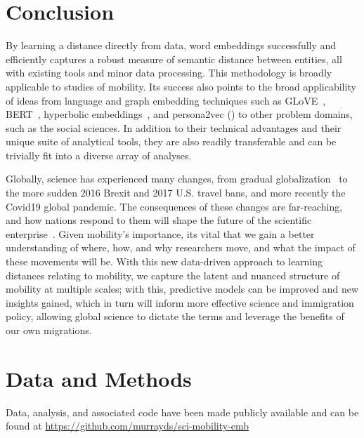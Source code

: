 \documentclass[12pt]{article} %
\begin{document}
%
%
\section*{Conclusion}

By learning a distance directly from data, word embeddings successfully  and efficiently captures a robust measure of semantic distance between entities, all with existing tools and minor data processing.
This methodology is broadly applicable to studies of mobility.
Its success also points to the broad applicability of ideas from language and graph embedding techniques such as GLoVE~\autocite{pennington2014glove}, BERT~\autocite{devlin2018bert}, hyperbolic embeddings~\autocite{nickel2017poincare, linzhuo2020hyperbolic}, and persona2vec () to other problem domains, such as the social sciences.
In addition to their technical advantages and their unique suite of analytical tools, they are also readily transferable and can be trivially fit into a diverse array of analyses.

Globally, science has experienced many changes, from gradual globalization~\autocite{czaika2018globalisation} to the more sudden 2016 Brexit and 2017 U.S. travel bans, and more recently the Covid19 global pandemic.
The consequences of these changes are far-reaching, and how nations respond to them will shape the future of the scientific enterprise~\autocite{chinchilla2018travelban, wagner2017open, sugimoto2017mostimpact, whetsell2019democracy}.
Given mobility's importance, its vital that we gain a better understanding of where, how, and why researchers move, and what the impact of these movements will be.
With this new data-driven approach to learning distances relating to mobility, we capture the latent and nuanced structure of mobility at multiple scales;
with this, predictive models can be improved and new insights gained, which in turn will inform more effective science and immigration policy, allowing global science to dictate the terms and leverage the benefits of our own migrations.


%
%
\section*{Data and Methods}
\label{sec:datamethods} %

Data, analysis, and associated code have been made publicly available and can be found at \url{https://github.com/murrayds/sci-mobility-emb}
\end{document}
